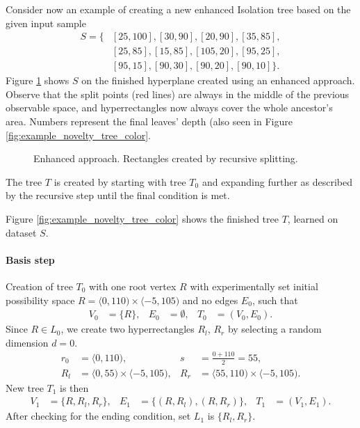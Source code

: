 \begin{example}
\label{example:novelty_tree_create}
Consider now an example of creating a new enhanced Isolation tree based on the given input sample
\begin{align*}
    S = \{&[25,100],[30,90],[20,90],[35,85],\\
    &[25,85],[15,85],[105,20],[95,25], \\
    &[95,15],[90,30],[90,20],[90,10]\}.
\end{align*}
Figure \ref{fig:example_novelty_gnu} shows $S$ on the finished hyperplane created using an enhanced approach. Observe that the split points (red lines) are always in the middle of the previous observable space, and hyperrectangles now always cover the whole ancestor's area. Numbers represent the final leaves' depth (also seen in Figure \ref{fig:example_novelty_tree_color}.

\begin{figure}[htbp]
\centering

\caption{Enhanced approach. Rectangles created by recursive splitting.}
\label{fig:example_novelty_gnu}
\end{figure}

 The tree $T$ is created by starting with tree $T_0$ and expanding further as described by the recursive step until the final condition is met.

Figure \ref{fig:example_novelty_tree_color} shows the finished tree $T$, learned on dataset $S$.


    \paragraph{Basis step} Creation of tree $T_0$ with one root vertex $R$ with experimentally set initial possibility space  $R= \langle 0,110) \times \langle -5,105)$ and no edges $E_0$, such that
    \begin{align*}
        V_0 &= \{R\},&
        E_0 &= \emptyset,&
        T_0 &= (V_0, E_0).
    \end{align*}
     Since $R \in L_0$, we create two hyperrectangles $R_l$, $R_r$ by selecting a random dimension $d=0$.
    \begin{align*}
        r_0 &= \langle 0, 110), &
        s &= \frac{0 + 110}{2} = 55, \\
        R_l &= \langle 0, 55) \times \langle -5,105), &
        R_r &= \langle 55, 110) \times \langle -5,105).
    \end{align*}
     New tree $T_1$ is then
    \begin{align*}
    V_1 &= \{R, R_l, R_r\}, &
    E_1 &= \{(R, R_l), (R, R_r)\}, &
    T_1 &= (V_1, E_1).
    \end{align*}
    After checking for the ending condition, set $L_1$ is $\{R_l, R_r\}$.


\end{example}

